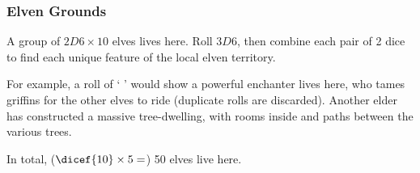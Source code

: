 \begin{multicols}{2}
\subsubsection{Elven Grounds}
\label{elvesPoint}

A group of $2D6 \times 10$ elves lives here.
Roll $3D6$, then combine each pair of 2 dice to find each unique feature of the local elven territory.

\begin{exampletext}
  For example, a roll of `  ' would show a powerful enchanter lives here, who tames griffins for the other elves to ride
  (duplicate rolls are discarded).
  Another elder has constructed a massive tree-dwelling, with rooms inside and paths between the various trees.

  In total, ($\dicef{10}\times 5 =$) 50 elves live here.


\end{exampletext}


\end{multicols}
